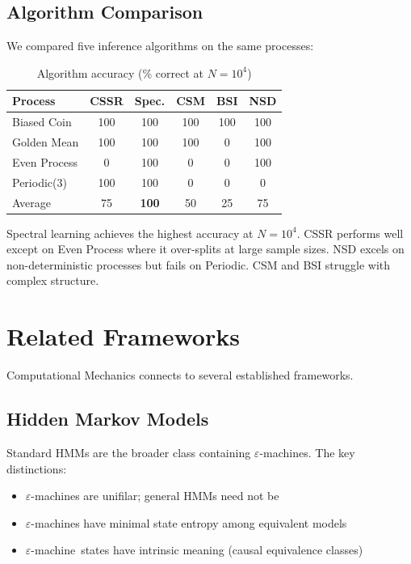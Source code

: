 \documentclass[11pt,twocolumn]{article}
\theoremstyle{plain}
\theoremstyle{definition}
\theoremstyle{remark}
\newcommand{\eps}{\varepsilon}
\newcommand{\eM}{$\eps$-machine}
\begin{document}
\subsection{Algorithm Comparison}

We compared five inference algorithms on the same processes:

\begin{table}[h]
\centering
\caption{Algorithm accuracy (\% correct at $N = 10^4$)}
\label{tab:algorithms}
\small
\begin{tabular}{lccccc}
\toprule
Process & CSSR & Spec. & CSM & BSI & NSD \\
\midrule
Biased Coin & 100 & 100 & 100 & 100 & 100 \\
Golden Mean & 100 & 100 & 100 & 0 & 100 \\
Even Process & 0 & 100 & 0 & 0 & 100 \\
Periodic(3) & 100 & 100 & 0 & 0 & 0 \\
\midrule
Average & 75 & \textbf{100} & 50 & 25 & 75 \\
\bottomrule
\end{tabular}
\end{table}

Spectral learning achieves the highest accuracy at $N = 10^4$. CSSR performs well except on Even Process where it over-splits at large sample sizes. NSD excels on non-deterministic processes but fails on Periodic. CSM and BSI struggle with complex structure.

\section{Related Frameworks}
\label{sec:related}

Computational Mechanics connects to several established frameworks.

\subsection{Hidden Markov Models}

Standard HMMs \cite{rabiner1989tutorial} are the broader class containing \eM s. The key distinctions:
\begin{itemize}[nosep]
    \item \eM s are unifilar; general HMMs need not be
    \item \eM s have minimal state entropy among equivalent models
    \item \eM\ states have intrinsic meaning (causal equivalence classes)
\end{itemize}
\end{document}
